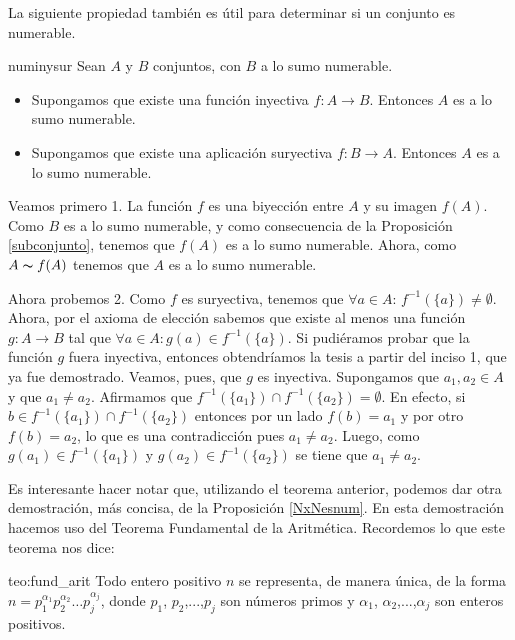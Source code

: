 La siguiente propiedad también es útil para determinar si un
conjunto es numerable.

\begin{proposicion}{numinysur} Sean $A$ y $B$ conjuntos, con $B$ a lo sumo
numerable.
\begin{itemize}
\item[1.] Supongamos que existe una función inyectiva 
$f:A \longrightarrow B$. Entonces $A$ es a lo sumo numerable.
\item[2.] Supongamos que existe una aplicación suryectiva
$f:B\longrightarrow A$. Entonces $A$ es a lo sumo numerable.
\end{itemize}
\end{proposicion}
\begin{demo} Veamos primero 1. La función $f$ es  una biyección entre $A$ y su
imagen $f(A)$. Como $B$ es a lo sumo numerable,  y como
consecuencia de la Proposición \vref{subconjunto}, tenemos que
$f(A)$ es a lo sumo numerable. Ahora, como $A\thicksim f(A)$
tenemos que $A$ es a lo sumo numerable.

Ahora probemos 2. Como $f$ es suryectiva, tenemos que $\forall
a\in A$: $f^{-1}(\{a\})\neq\emptyset$. Ahora, por el axioma de
elección sabemos que existe al menos una función
$g:A\longrightarrow B$ tal que $\forall a\in A:g(a)\in
f^{-1}(\{a\})$. Si pudiéramos probar que la función $g$ fuera
inyectiva, entonces obtendríamos la tesis a partir del inciso
1, que ya fue demostrado. Veamos, pues, que $g$ es inyectiva.
Supongamos que $a_1,a_2\in A$ y que $a_1\neq a_2$. Afirmamos que
$f^{-1}(\{a_1\})\cap f^{-1}(\{a_2\})=\emptyset$. En efecto, si
$b\in f^{-1}(\{a_1\})\cap f^{-1}(\{a_2\})$ entonces por un lado
 $f(b)=a_1$ y por otro $f(b)=a_2$, lo que es una contradicción pues $a_1\neq a_2$. Luego, como $g(a_1)\in f^{-1}(\{a_1\})$ y 
$g(a_2)\in f^{-1}(\{a_2\})$ se tiene que $a_1\neq a_2$.
 \end{demo}

Es interesante hacer notar que, utilizando el teorema anterior,
podemos dar otra demostración, más concisa, de la
Proposición \vref{NxNesnum}. En esta demostración hacemos uso del Teorema Fundamental de la
Aritmética. Recordemos lo que este teorema nos dice:


\begin{teorema}{teo:fund_arit} Todo entero positivo $n$ se representa, de
manera única, de la forma $n=p_1^{\alpha_1}p_2^{\alpha_2}\dots
p_j^{\alpha_j}$, donde $p_1$, $p_2$,...,$p_j$ son números primos
y $\alpha_1$, $\alpha_2$,...,$\alpha_j$ son enteros positivos.
\end{teorema}

